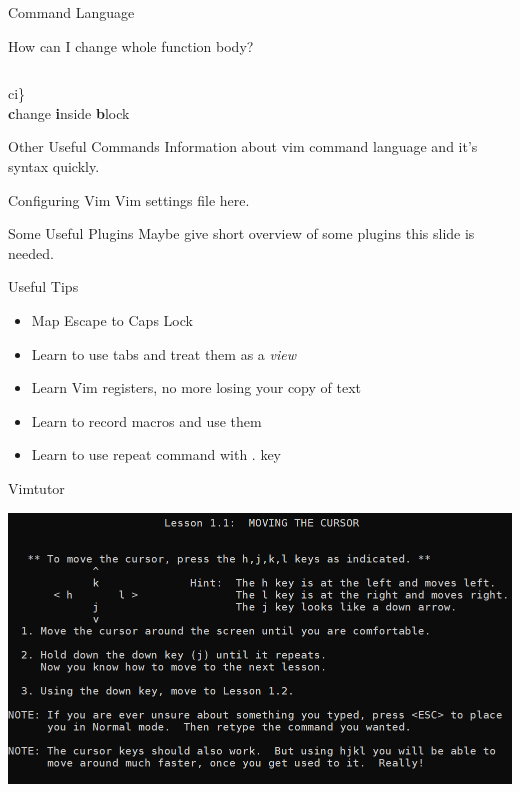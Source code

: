 \documentclass{beamer}
\begin{document}
\begin{frame}{Command Language}
    \begin{block}{How can I change whole function body?}
    \end{block}
    \inputminted{js}{codes/changeInsideBlock.js}
    \pause
    \begin{center}
        \huge
        ci\}
        \\
        \textbf{c}hange \textbf{i}nside \textbf{b}lock
    \end{center}
\end{frame}

\begin{frame}{Other Useful Commands}
    Information about vim command language and it's syntax quickly.
\end{frame}

\begin{frame}{Configuring Vim}
    Vim settings file here.
\end{frame}

\begin{frame}{Some Useful Plugins}
    Maybe give short overview of some plugins this slide is needed.
\end{frame}

\begin{frame}{Useful Tips}
    \begin{itemize}
        \item Map Escape to Caps Lock
        \item Learn to use tabs and treat them as a \emph{view}
        \item Learn Vim registers, no more losing your copy of text
        \item Learn to record macros and use them
        \item Learn to use repeat command with . key
    \end{itemize}
\end{frame}

\begin{frame}{Vimtutor}
    \begin{center}
        \includegraphics[width=1\textwidth]{images/vimtutor.png}
    \end{center}
\end{frame}
\end{document}
